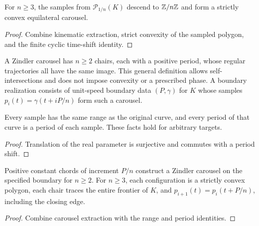 \begin{proposition}
\label{prop:extraction}
\leanok
{}
For $n\geq3$, the samples from $\mathcal P_{1/n}(K)$ descend to
$\mathbb{Z}/n\mathbb{Z}$ and form a strictly convex equilateral carousel.
\end{proposition}
\begin{proof}
\leanok
Combine kinematic extraction, strict convexity of the sampled polygon,
and the finite cyclic time-shift identity.
\end{proof}

\begin{definition}
\label{def:zindler}
\leanok
{}
A Zindler carousel has $n\geq2$ chairs, each with a positive period,
whose regular trajectories all have the same image. This general definition
allows self-intersections and does not impose convexity or a prescribed phase.
A boundary realization consists of unit-speed boundary data $(P,\gamma)$
for $K$ whose samples $p_i(t)=\gamma(t+iP/n)$ form such a carousel.
\end{definition}

\begin{lemma}
\label{lem:zindler-samples}
\leanok
{}
Every sample has the same range as the original curve, and every period
of that curve is a period of each sample. These facts hold for arbitrary targets.
\end{lemma}
\begin{proof}
\leanok
Translation of the real parameter is surjective and commutes with a period shift.
\end{proof}

\begin{proposition}
\label{prop:zindler-construction}
\leanok
{}
Positive constant chords of increment $P/n$ construct a Zindler carousel
on the specified boundary for $n\geq2$. For $n\geq3$, each configuration
is a strictly convex polygon, each chair traces the entire frontier of $K$,
and $p_{i+1}(t)=p_i(t+P/n)$, including the closing edge.
\end{proposition}
\begin{proof}
\leanok
Combine carousel extraction with the range and period identities.
\end{proof}

